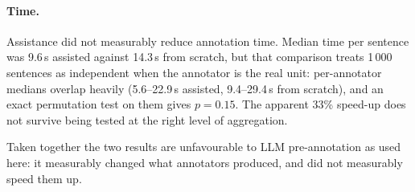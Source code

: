 \paragraph{Time.}
Assistance did not measurably reduce annotation time. Median time per sentence was 9.6\,s assisted against 14.3\,s from scratch, but that comparison treats 1\,000 sentences as independent when the annotator is the real unit: per-annotator medians overlap heavily (5.6--22.9\,s assisted, 9.4--29.4\,s from scratch), and an exact permutation test on them gives $p = 0.15$. The apparent 33\% speed-up does not survive being tested at the right level of aggregation.

Taken together the two results are unfavourable to LLM pre-annotation as used here: it measurably changed what annotators produced, and did not measurably speed them up.